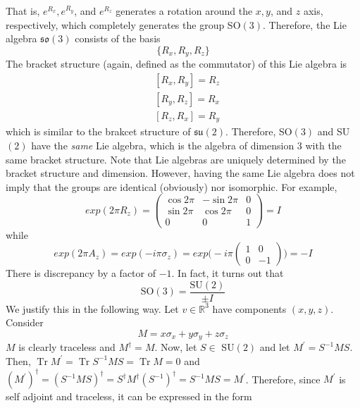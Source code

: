 \documentclass{article}
\DeclareMathOperator{\Tr}{Tr}
\begin{document}
      That is, $e^{R_x}, e^{R_y}$, and $e^{R_z}$ generates a rotation around the $x, y$, and $z$ axis, respectively, which completely generates the group SO$(3)$. Therefore, the Lie algebra $\mathfrak{so}(3)$ consists of the basis 
      \begin{equation}
        \{R_x, R_y, R_z\}
      \end{equation}
      The bracket structure (again, defined as the commutator) of this Lie algebra is 
      \begin{align*}
        & [R_x, R_y] = R_z \\
        & [R_y, R_z] = R_x \\
        & [R_z, R_x] = R_y
      \end{align*}
      which is similar to the brakcet structure of $\mathfrak{su}(2)$. Therefore, SO$(3)$ and SU$(2)$ have the \textit{same} Lie algebra, which is the algebra of dimension 3 with the same bracket structure. Note that Lie algebras are uniquely determined by the bracket structure and dimension. However, having the same Lie algebra does not imply that the groups are identical (obviously) nor isomorphic. For example, 
      \begin{equation}
        exp(2\pi R_z) = \begin{pmatrix}
        \cos{2\pi} & -\sin{2\pi} & 0 \\
        \sin{2\pi} & \cos{2\pi} & 0 \\
        0 & 0 & 1
        \end{pmatrix} = I
      \end{equation}
      while 
      \begin{equation}
        exp(2\pi A_z) = 
        exp(-i \pi \sigma_z) = exp \bigg(-i \pi \begin{pmatrix}
        1&0\\0&-1
        \end{pmatrix} \bigg) = -I
      \end{equation}
      There is discrepancy by a factor of $-1$. In fact, it turns out that
      \begin{equation}
        \text{SO}(3) = \frac{\text{SU}(2)}{\pm I}
      \end{equation}
      We justify this in the following way. Let $v \in \mathbb{R}^3$ have components $(x, y, z)$. Consider
      \begin{equation}
        M = x \sigma_x + y \sigma_y + z \sigma_z
      \end{equation}
      $M$ is clearly traceless and $M^\dagger = M$. Now, let $S \in$ SU$(2)$ and let $M^\prime = S^{-1} M S$. Then, $\Tr{M^\prime} = \Tr{S^{-1} M S} = \Tr{M} = 0$ and $(M^\prime)^\dagger = (S^{-1} M S)^\dagger = S^\dagger M^\dagger (S^{-1})^\dagger = S^{-1} M S = M^\prime$. Therefore, since $M^\prime$ is self adjoint and traceless, it can be expressed in the form
\end{document}
